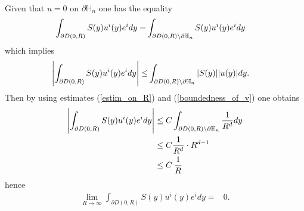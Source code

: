 \documentclass[11pt, reqno]{amsart}
\theoremstyle{definition}
\theoremstyle{remark}
\numberwithin{equation}{section}
\newcommand{\bs}{\symbol{92}}
\begin{document}
\begin{appendices}
		\\
		Given that $u=0$ on $\partial\mathbb{H}_n $ one has the equality
		\begin{align*}
			\int_{\partial D(0,R)}   S(y) u^i(y) e^i  dy= & 	\int_{\partial D(0,R)\bs \partial\mathbb{H}_n }    S(y) u^i(y) e^i dy
		\end{align*}
		which implies 
		\begin{align*}
			\left|  \int_{\partial D(0,R)}   S(y) u^i(y) e^i  dy \right| \leq  & 	\int_{\partial D(0,R)\bs \partial\mathbb{H}_n    }  |S(y)| |u(y)|dy.
		\end{align*}
		Then by using estimates (\ref{estim_on_R}) and (\ref{boundedness_of_v}) one obtains
		\begin{align*}
			\left| \int_{\partial D(0,R)}   S(y) u^i(y) e^i dy\right| \leq  & 	\; C\int_{  \partial D(0,R) \bs \partial\mathbb{H}_n}    \frac{  1}{R^{d}} dy\\ 
			\leq  & 	\; C    \frac{1}{R^{d}} \cdot R^{d-1}\\
			\leq  & 	\; C   \, \frac{1}{R^{}} 
		\end{align*}
		hence
		\begin{align*}
			\lim_{R\rightarrow\infty} 	\int_{  \partial D(0,R) }    S(y) u^i(y) e^i dy
			=&		 0 .
		\end{align*}
		

\end{appendices}
\end{document}
